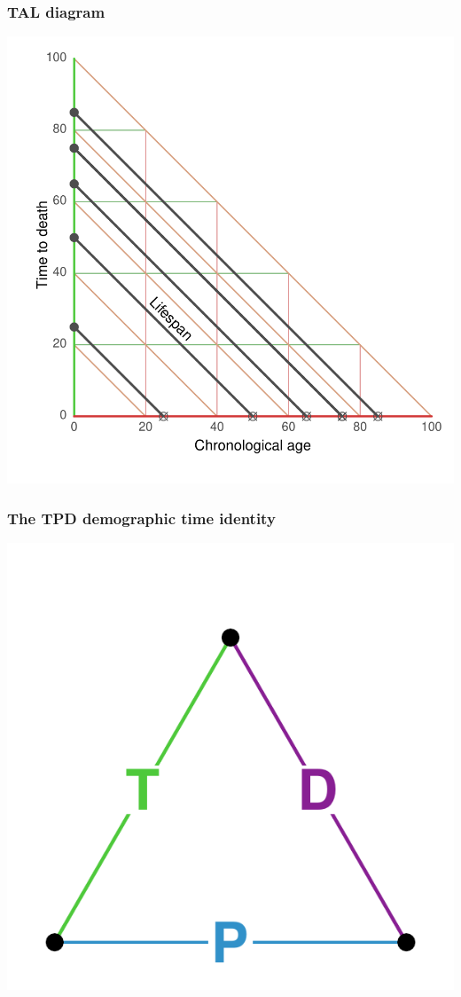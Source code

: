 \documentclass[20pt]{beamer}
\begin{document}

\begin{frame}
\frametitle{TAL diagram}
\begin{center}
\includegraphics[scale=1.1]{Figures/TALrt.pdf}
\end{center}
\end{frame}


\begin{frame}
\frametitle{The TPD demographic time identity}
\vspace{-4em}
\begin{center}
\includegraphics[scale=1.7]{Figures/TPDid.pdf}
\end{center}
\end{frame}
\end{document}
